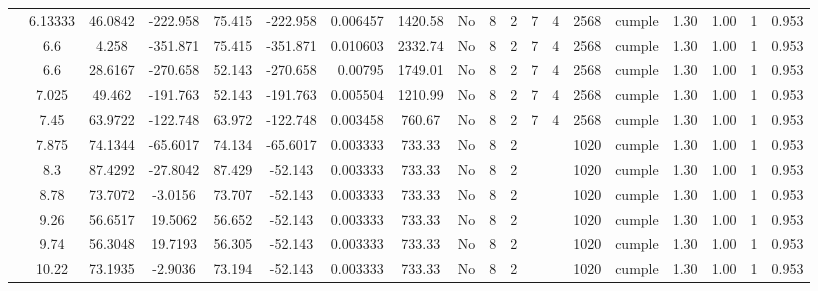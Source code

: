 \begin{table}[H]
{\begin{tabular}{|c|c|c|c|c|c|r|c|c|c|c|c|c|c|c|c|c|c|c|}
\cline{2-19}        & 6.13333 & 46.0842 & -222.958 & 75.415 & -222.958 & 0.006457 & 1420.58 & No  & 8   & 2   & 7   & 4   & 2568 & \cellcolor[rgb]{ .776,  .937,  .808}cumple & 1.30 & 1.00 & 1   & 0.953 \bigstrut\\
\cline{2-19}        & \cellcolor[rgb]{ .851,  .882,  .949}6.6 & 4.258 & -351.871 & 75.415 & -351.871 & 0.010603 & 2332.74 & No  & 8   & 2   & 7   & 4   & 2568 & \cellcolor[rgb]{ .776,  .937,  .808}cumple & 1.30 & 1.00 & 1   & 0.953 \bigstrut\\
\cline{2-19}        & \cellcolor[rgb]{ .851,  .882,  .949}6.6 & 28.6167 & -270.658 & 52.143 & -270.658 & 0.00795 & 1749.01 & No  & 8   & 2   & 7   & 4   & 2568 & \cellcolor[rgb]{ .776,  .937,  .808}cumple & 1.30 & 1.00 & 1   & 0.953 \bigstrut\\
\cline{2-19}        & 7.025 & 49.462 & -191.763 & 52.143 & -191.763 & 0.005504 & 1210.99 & No  & 8   & 2   & 7   & 4   & 2568 & \cellcolor[rgb]{ .776,  .937,  .808}cumple & 1.30 & 1.00 & 1   & 0.953 \bigstrut\\
\cline{2-19}        & 7.45 & 63.9722 & -122.748 & 63.972 & -122.748 & 0.003458 & 760.67 & No  & 8   & 2   & 7   & 4   & 2568 & \cellcolor[rgb]{ .776,  .937,  .808}cumple & 1.30 & 1.00 & 1   & 0.953 \bigstrut\\
\cline{2-19}        & 7.875 & 74.1344 & -65.6017 & 74.134 & -65.6017 & 0.003333 & 733.33 & No  & 8   & 2   &     &     & 1020 & \cellcolor[rgb]{ .776,  .937,  .808}cumple & 1.30 & 1.00 & 1   & 0.953 \bigstrut\\
\cline{2-19}        & 8.3 & 87.4292 & -27.8042 & 87.429 & -52.143 & 0.003333 & 733.33 & No  & 8   & 2   &     &     & 1020 & \cellcolor[rgb]{ .776,  .937,  .808}cumple & 1.30 & 1.00 & 1   & 0.953 \bigstrut\\
\cline{2-19}        & 8.78 & 73.7072 & -3.0156 & 73.707 & -52.143 & 0.003333 & 733.33 & No  & 8   & 2   &     &     & 1020 & \cellcolor[rgb]{ .776,  .937,  .808}cumple & 1.30 & 1.00 & 1   & 0.953 \bigstrut\\
\cline{2-19}        & 9.26 & 56.6517 & 19.5062 & 56.652 & -52.143 & 0.003333 & 733.33 & No  & 8   & 2   &     &     & 1020 & \cellcolor[rgb]{ .776,  .937,  .808}cumple & 1.30 & 1.00 & 1   & 0.953 \bigstrut\\
\cline{2-19}        & 9.74 & 56.3048 & 19.7193 & 56.305 & -52.143 & 0.003333 & 733.33 & No  & 8   & 2   &     &     & 1020 & \cellcolor[rgb]{ .776,  .937,  .808}cumple & 1.30 & 1.00 & 1   & 0.953 \bigstrut\\
\cline{2-19}        & 10.22 & 73.1935 & -2.9036 & 73.194 & -52.143 & 0.003333 & 733.33 & No  & 8   & 2   &     &     & 1020 & \cellcolor[rgb]{ .776,  .937,  .808}cumple & 1.30 & 1.00 & 1   & 0.953 \bigstrut\\

\end{tabular}}
\end{table}

